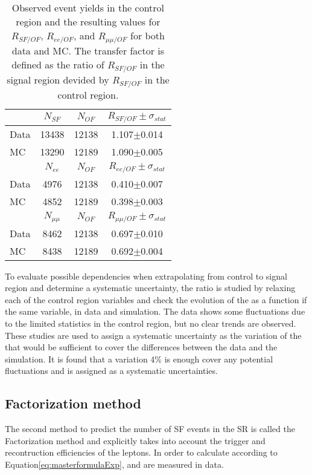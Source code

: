 \begin{table}[ht!]
\def\arraystretch{1.2}
\setlength{\belowcaptionskip}{6pt} 
\small                            
\centering                           
\caption{Observed event yields in the control region and the resulting values for $R_{SF/OF}$, $R_{ee/OF}$, and $R_{\mu\mu/OF}$ for both data and MC. 
The transfer factor is defined as the ratio of $R_{SF/OF}$ in the signal region devided by $R_{SF/OF}$ in the control region.}
\label{tab:rSFOF}
\begin{tabular}{ l c c c}
        \hline \hline
        & $N_{SF}$ & $N_{OF}$ & $ R_{SF/OF} \pm \sigma_{stat}$  \\    
        \hline
         Data & 13438 & 12138 & 1.107$\pm$0.014\\
         MC   & 13290 & 12189 & 1.090$\pm$0.005\\ 
        \hline
         & $N_{ee}$ & $N_{OF}$ & $ R_{ee/OF} \pm \sigma_{stat}$ \\    
        \hline
         Data & 4976 & 12138 & 0.410$\pm$0.007 \\
         MC   & 4852 & 12189 & 0.398$\pm$0.003 \\
        \hline
         & $N_{\mu\mu}$ & $N_{OF}$ & $ R_{\mu\mu/OF} \pm \sigma_{stat}$\\    
        \hline
         Data & 8462 & 12138 & 0.697$\pm$0.010 \\
         MC   & 8438 & 12189 & 0.692$\pm$0.004 \\ \hline\hline
\end{tabular}
\end{table}                                                                                                                                                                    
To evaluate possible dependencies when extrapolating from control to signal region and determine a systematic uncertainty, the ratio \Rsfof is studied by relaxing each of the control region variables and check the evolution of the \Rsfof as a function if the same variable, in data and simulation.  
The data shows some fluctuations due to the limited statistics in the control region, but no clear trends are observed.
These studies are used to assign a systematic uncertainty as the variation of the \Rsfof that would be sufficient to cover the differences between the data and the simulation. 
It is found that a variation 4\% is enough cover any potential fluctuations and is assigned as a systematic uncertainties. 
\subsection*{Factorization method}\label{sec:factorizationMethod}
\noindent
\justify
The second method to predict the number of SF events in the SR is called the Factorization method and explicitly takes into account the trigger and recontruction efficiencies of the leptons.   
In order to calculate \Rsfof according to Equation\ref{eq:masterformulaExp}, \rmue and \RT are measured in data.
